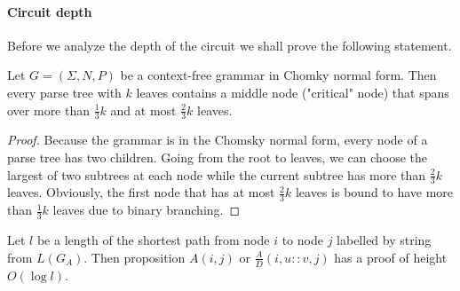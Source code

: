 \paragraph{Circuit depth}
Before we analyze the depth of the circuit we shall prove the following statement.
\begin{lemma}
\label{bigsubtree}
Let $G = (\Sigma, N, P)$ be a context-free grammar in Chomky normal form. Then every parse tree with $k$ leaves contains a middle node ("critical" node) that spans over more than $\frac{1}{3}k$ and at most $\frac{2}{3}k$ leaves.
\end{lemma}
\begin{proof} Because the grammar is in the Chomsky normal form, every node of a parse tree has two children. Going from the root to leaves, we can choose the largest of two subtrees at each node while the current subtree has more than $\frac{2}{3}k$ leaves. Obviously, the first node that has at most $\frac{2}{3}k$ leaves is bound to have more than $\frac{1}{3}k$ leaves due to binary branching. 
\end{proof}
\begin{lemma}
\label{depthproof}
Let $l$ be a length of the shortest path from node $i$  to node $j$ labelled by string from $L(G_A)$. Then proposition $A(i, j)$ or $\frac{A}{D}(i , u :: v, j)$ has a proof of height $O(\log l)$.
\end{lemma}
